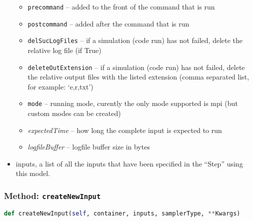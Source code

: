 \begin{itemize}
\begin{itemize}
    \item \texttt{precommand} -- added to the front of the command that is run
    \item \texttt{postcommand} -- added after the command that is run
    \item \texttt{delSucLogFiles} -- if a simulation (code run) has not failed,
    delete the relative log file (if True)
    \item \texttt{deleteOutExtension} -- if a simulation (code run) has not
    failed, delete the relative output files with the listed extension (comma
    separated list, for example: `e,r,txt')
    \item \texttt{mode} -- running mode, curently the only mode supported is
      mpi (but custom modes can be created)
    \item \textit{expectedTime} -- how long the complete input is expected to
    run
    \item \textit{logfileBuffer} -- logfile buffer size in bytes
  \end{itemize}
  \item inputs, a list of all the inputs that have been specified in the
  ``Step'' using this model.
\end{itemize}

\subsubsection{Method: \texttt{createNewInput}}
\label{subsubsec:externalCreateNewInputExternalModelPlugin}
\begin{lstlisting}[language=python]
  def createNewInput(self, container, inputs, samplerType, **Kwargs)
\end{lstlisting}
